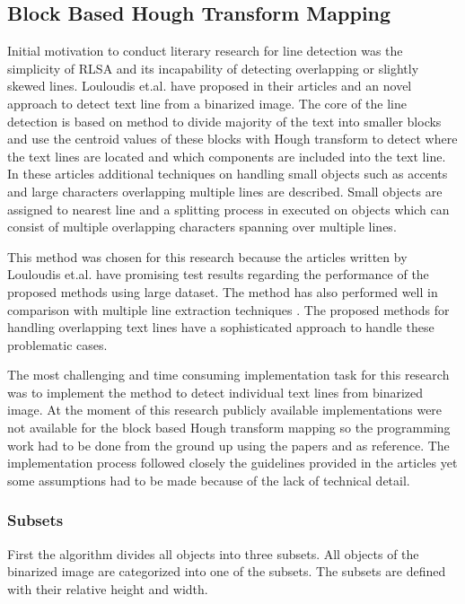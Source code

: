 \documentclass{article}
\begin{document}
        \subsection{Block Based Hough Transform Mapping}
          Initial motivation to conduct literary research for line detection was the simplicity of RLSA and its incapability of detecting overlapping or slightly skewed lines. Louloudis et.al. have proposed in their articles \cite{Louloudis1} and \cite{Louloudis2} an novel approach to detect text line from a binarized image. The core of the line detection is based on method to divide majority of the text into smaller blocks and use the centroid values of these blocks with Hough transform to detect where the text lines are located and which components are included into the text line. In these articles additional techniques on handling small objects such as accents and large characters overlapping multiple lines are described. Small objects are assigned to nearest line and a splitting process in executed on objects which can consist of multiple overlapping characters spanning over multiple lines.

          This method was chosen for this research because the articles written by Louloudis et.al. have promising test results regarding the performance of the proposed methods using large dataset. The method has also performed well in comparison with multiple line extraction techniques \cite{Razak}. The proposed methods for handling overlapping text lines have a sophisticated approach to handle these problematic cases.

          The most challenging and time consuming implementation task for this research was to implement the method to detect individual text lines from binarized image. At the moment of this research publicly available implementations were not available for the block based Hough transform mapping so the programming work had to be done from the ground up using the papers \cite{Louloudis1} and \cite{Louloudis2} as reference. The implementation process followed closely the guidelines provided in the articles yet some assumptions had to be made because of the lack of technical detail.

          \subsubsection{Subsets}
            First the algorithm divides all objects into three subsets. All objects of the binarized image are categorized into one of the subsets. The subsets are defined with their relative height and width.
\end{document}
